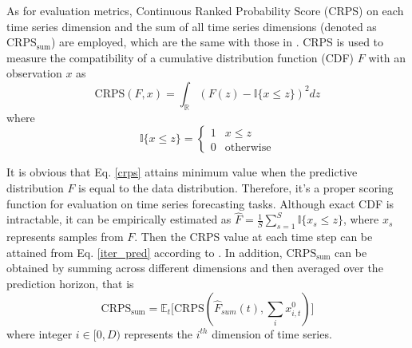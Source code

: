 As for evaluation metrics, Continuous Ranked Probability Score (CRPS) \cite{matheson1976scoring} on each time series dimension and the sum of all time series dimensions (denoted as $\text{CRPS}_{\text{sum}}$) are employed, which are the same with those in \cite{rasul2020multi,rasul2021autoregressive}. CRPS is used to measure the compatibility of a cumulative distribution function (CDF) $F$ with an observation $x$ as
\begin{equation}\label{crps}
	\text{CRPS}(F,x)=\int_{\mathbb{R}}(F(z)-\mathbb{I}\{x\leq z\})^2dz
\end{equation}
where
$$\mathbb{I}\{x\leq z\}=\left\{
\begin{array}{rcl}
	1& x\leq z\\
	0 & \text{otherwise}
\end{array}
\right.$$

It is obvious that Eq. \ref{crps} attains minimum value when the predictive distribution $F$ is equal to the data distribution. Therefore, it's a proper scoring function for evaluation on time series forecasting tasks. Although exact CDF is intractable, it can be empirically estimated as $\hat F=\frac{1}{S}\sum^S_{s=1}\mathbb{I}\{x_s\leq z\}$, where $x_s$ represents samples from $F$. Then the CRPS value at each time step can be attained from Eq. \ref{iter_pred} according to \cite{jordan2017evaluating}. In addition, $\text{CRPS}_{\text{sum}}$ can be obtained by summing across different dimensions and then averaged over the prediction horizon, that is
\begin{equation}
	\text{CRPS}_{\text{sum}} = \mathbb{E}_t\big[\text{CRPS}(\hat F_{sum}(t), \sum_ix_{i,t}^0)\big]
\end{equation}
where integer $i\in [0, D)$ represents the $i^{th}$ dimension of time series.

